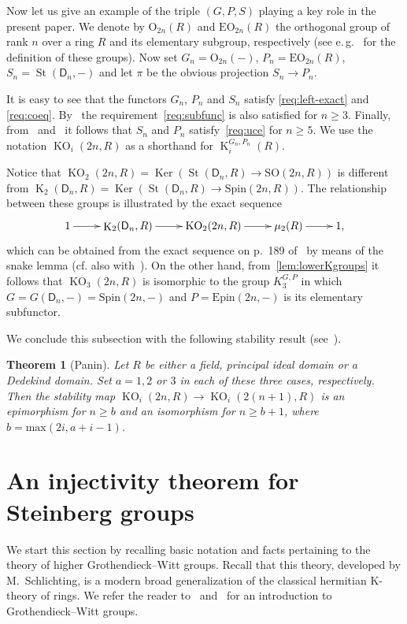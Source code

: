 \documentclass[oneside, 8pt]{amsart}
\newtheorem{externaltheorem}[lemma]{Theorem}
\theoremstyle{remark}
\theoremstyle{definition}
\numberwithin{lemma}{section}
\numberwithin{prop}{section}
\numberwithin{corollary}{section}
\numberwithin{externaltheorem}{section}
\DeclareMathOperator{\Ker}{Ker}
\DeclareMathOperator{\St}{St}
\DeclareMathOperator{\K}{K}
\DeclareMathOperator{\KO}{KO}
\newcommand{\rD}{\mathsf{D}}
\numberwithin{equation}{section}
\begin{document}
Now let us give an example of the triple $(G, P, S)$ playing a key role in the present paper.
We denote by $\mathrm{O}_{2n}(R)$ and $\mathrm{EO}_{2n}(R)$ the orthogonal group of rank $n$ over a ring $R$ and its elementary subgroup, respectively
 (see e.\,g.~\cite{Su82} for the definition of these groups).
Now set $G_n = \mathrm{O}_{2n}(-)$, $P_n = \mathrm{EO}_{2n}(R)$, $S_n = \St(\rD_n, -)$ and let $\pi$ be the obvious projection $S_n \to P_n$.

It is easy to see that the functors $G_n$, $P_n$ and $S_n$ satisfy \ref{req:left-exact} and \ref{req:coeq}.
By~\cite{Su82} the requirement~\ref{req:subfunc} is also satisfied for $n \geq 3$.
Finally, from~\cite[Corollary~5.4]{St71} and~\cite[Theorem~1]{LS17} it follows that $S_n$ and $P_n$ satisfy~\ref{req:uce} for $n \geq 5$.
We use the notation $\KO_i(2n, R)$ as a shorthand for $\K_i^{G_n, P_n}(R)$. 

Notice that $\KO_2(2n, R) = \Ker(\St(\rD_n, R) \to \mathrm{SO}(2n, R))$ is different from $\K_2(\rD_n, R) = \Ker(\St(\rD_n, R) \to \mathrm{Spin}(2n, R))$. The relationship between these groups is illustrated by the exact sequence
\[ \xymatrix{ 1 \ar[r] & \K_2(\rD_n, R) \ar[r] & \KO_2(2n, R) \ar[r] & \mu_2(R) \ar[r] & 1,} \]
which can be obtained from the exact sequence on p.~189 of~\cite{Ba74} by means of the snake lemma (cf. also with~\cite[Corollary~4.3.5]{Ba74}).
On the other hand, from~\cref{lem:lowerKgroups} it follows that $\KO_3(2n, R)$ is isomorphic to the group $K_3^{G, P}$ in which $G = G(\rD_n, -) = \mathrm{Spin}(2n, -)$ and $P = \mathrm{Epin}(2n, -)$ is its elementary subfunctor.

We conclude this subsection with the following stability result (see~\cite[Theorem~9.4]{Pa89}).
\begin{externaltheorem}[Panin] \label{Panin-stability}
 Let $R$ be either a field, principal ideal domain or a Dedekind domain. Set $a = 1,2$ or $3$ in each of these three cases, respectively.
 Then the stability map $\KO_i(2n, R) \to \KO_i(2(n+1), R)$ is an epimorphism for $n \geq b$ 
 and an isomorphism for $n \geq b + 1$, where $b = \mathrm{max}(2i, a+i-1)$. \end{externaltheorem}

\section{An injectivity theorem for Steinberg groups} \label{firstPart}
We start this section by recalling basic notation and facts pertaining to the theory of higher Grothendieck--Witt groups. Recall that this theory, developed by M.~Schlichting, is a modern broad generalization of the classical hermitian K-theory of rings. We refer the reader to~\cite[\S~2]{FRS12} and~\cite[\S~2]{AF17} for an introduction to Grothendieck--Witt groups.
\end{document}
